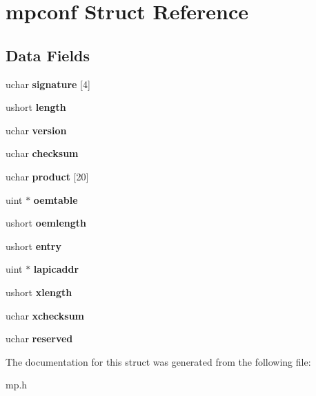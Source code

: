 \hypertarget{structmpconf}{}\section{mpconf Struct Reference}
\label{structmpconf}
\subsection*{Data Fields}
\begin{DoxyCompactItemize}
\item 
\mbox{\label{structmpconf_a7bf26b6b2b09d4265ffcbdb362bc5c8b}} 
uchar {\bfseries signature} \mbox{[}4\mbox{]}
\item 
\mbox{\label{structmpconf_a6b7583180c78b6a2e490d6c72779d8dd}} 
ushort {\bfseries length}
\item 
\mbox{\label{structmpconf_ade1055584605c76f4e1134d6631e0afa}} 
uchar {\bfseries version}
\item 
\mbox{\label{structmpconf_aac54c4c7710b90574416a945cdcd3b9e}} 
uchar {\bfseries checksum}
\item 
\mbox{\label{structmpconf_ac4e4d4d150aac8ea0bba92ff2cfae557}} 
uchar {\bfseries product} \mbox{[}20\mbox{]}
\item 
\mbox{\label{structmpconf_a1b3e44d3639e8f3117e6bca9626d680b}} 
uint $\ast$ {\bfseries oemtable}
\item 
\mbox{\label{structmpconf_a5aaf9c7afa2f1be645b8e633f6ff43a1}} 
ushort {\bfseries oemlength}
\item 
\mbox{\label{structmpconf_a75f67295a180d1f72b93be82e09ecc2a}} 
ushort {\bfseries entry}
\item 
\mbox{\label{structmpconf_a087fac7e9dc4ca1fdfe142b3adf96c99}} 
uint $\ast$ {\bfseries lapicaddr}
\item 
\mbox{\label{structmpconf_adbda8ec5a43970662e7eab8f8da11817}} 
ushort {\bfseries xlength}
\item 
\mbox{\label{structmpconf_a499447fb50cb158a848f66f124dd8f8d}} 
uchar {\bfseries xchecksum}
\item 
\mbox{\label{structmpconf_ab7ce4c5b90a538f41baefef6714d1a23}} 
uchar {\bfseries reserved}
\end{DoxyCompactItemize}


The documentation for this struct was generated from the following file\+:\begin{DoxyCompactItemize}
\item 
mp.\+h\end{DoxyCompactItemize}
